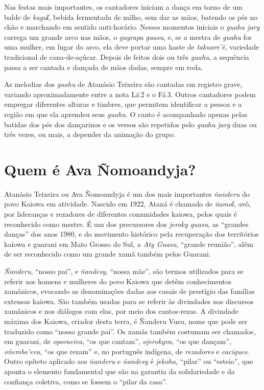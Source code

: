Nas festas mais importantes, os cantadores iniciam a dança em torno de
um balde de \textit{kaguῖ}, bebida fermentada de milho, sem dar as mãos,
batendo os pés no chão e marchando em sentido anti-horário. Nesses
momentos iniciais o \textit{guahu jary} carrega um grande arco nas mãos, o 
\textit{guyrapa guasu}, e, se a mestra de \textit{guahu} for uma
mulher, em lugar do arco, ela deve portar uma haste de \textit{takuare'ẽ},
variedade tradicional de cana-de-açúcar. Depois de feitos dois ou três
\textit{guahu}, a sequência passa a ser cantada e dançada de mãos dadas,
sempre em roda.

As melodias dos \textit{guahu} de Atanásio Teixeira são cantadas em
registro grave, variando aproximadamente entre a nota Lá\,\textsc{2} e o Fá\,\textsc{3}.
Outros cantadores podem empregar diferentes alturas e timbres, que
permitem identificar a pessoa e a região em que ela aprendeu seus
\textit{guahu}. O canto é acompanhado apenas pelas batidas dos pés dos
dançarinos e os versos são repetidos pelo \textit{guahu jary} duas ou três
vezes, ou mais, a depender da animação do grupo.

\section{Quem é Ava Ñomoandyja?}

Atanásio Teixeira ou Ava Ñomoandyja é um dos mais importantes
\textit{ñanderu} do povo Kaiowa em atividade. Nascido em 1922, Ataná é
chamado de \textit{ñamoῖ}, avô, por lideranças e rezadores de diferentes
comunidades kaiowa, pelos quais é reconhecido como mestre. É um dos
precursores dos \textit{jeroky guasu}, as ``grandes danças'' dos anos 1980, e do
movimento histórico pela recuperação dos territórios kaiowa e guarani em
Mato Grosso do Sul, a \textit{Aty Guasu}, ``grande reunião'', além de ser 
reconhecido como um grande xamã também pelos Guarani.

\textit{Ñanderu}, ``nosso pai'', e \textit{ñandesy}, ``nossa mãe'', são
termos utilizados para se referir aos homens e mulheres do povo Kaiowa
que detêm conhecimentos xamânicos, evocando as denominações dadas aos
casais de prestígio das famílias extensas kaiowa. São também usadas para se
referir às divindades nos discursos xamânicos e nos diálogos com elas,
por meio dos cantos-rezas. A divindade máxima dos Kaiowa, criador desta
terra, é Ñanderu Vusu, nome que pode ser traduzido como ``nosso grande
pai''. Os xamãs também costumam ser chamados, em guarani, de
\textit{oporaeiva}, ``os que cantam'', \textit{ojerokyva}, ``os que
dançam'', \textit{oñembo'eva}, ``os que rezam'' e, no português indígena,
de \textit{rezadores} e \textit{caciques}. Outro epíteto aplicado aos
\textit{ñanderu} e \textit{ñandesy} é \textit{jekoha}, ``pilar'' ou ``esteio'',
que aponta o elemento fundamental que são na garantia da solidariedade e
da confiança coletiva, como se fossem o ``pilar da casa''.

